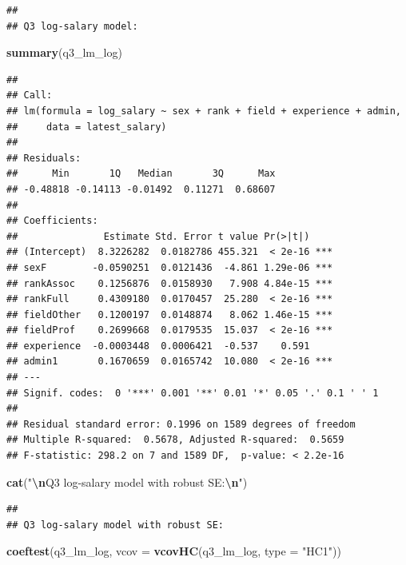 \documentclass[
]{article}
\newenvironment{Shaded}{\begin{snugshade}}{\end{snugshade}}
\newcommand{\AttributeTok}[1]{\textcolor[rgb]{0.13,0.29,0.53}{#1}}
\newcommand{\FunctionTok}[1]{\textcolor[rgb]{0.13,0.29,0.53}{\textbf{#1}}}
\newcommand{\NormalTok}[1]{#1}
\newcommand{\SpecialCharTok}[1]{\textcolor[rgb]{0.81,0.36,0.00}{\textbf{#1}}}
\newcommand{\StringTok}[1]{\textcolor[rgb]{0.31,0.60,0.02}{#1}}
\begin{document}
\begin{verbatim}
## 
## Q3 log-salary model:
\end{verbatim}

\begin{Shaded}
\begin{Highlighting}[]
\FunctionTok{summary}\NormalTok{(q3\_lm\_log)}
\end{Highlighting}
\end{Shaded}

\begin{verbatim}
## 
## Call:
## lm(formula = log_salary ~ sex + rank + field + experience + admin, 
##     data = latest_salary)
## 
## Residuals:
##      Min       1Q   Median       3Q      Max 
## -0.48818 -0.14113 -0.01492  0.11271  0.68607 
## 
## Coefficients:
##               Estimate Std. Error t value Pr(>|t|)    
## (Intercept)  8.3226282  0.0182786 455.321  < 2e-16 ***
## sexF        -0.0590251  0.0121436  -4.861 1.29e-06 ***
## rankAssoc    0.1256876  0.0158930   7.908 4.84e-15 ***
## rankFull     0.4309180  0.0170457  25.280  < 2e-16 ***
## fieldOther   0.1200197  0.0148874   8.062 1.46e-15 ***
## fieldProf    0.2699668  0.0179535  15.037  < 2e-16 ***
## experience  -0.0003448  0.0006421  -0.537    0.591    
## admin1       0.1670659  0.0165742  10.080  < 2e-16 ***
## ---
## Signif. codes:  0 '***' 0.001 '**' 0.01 '*' 0.05 '.' 0.1 ' ' 1
## 
## Residual standard error: 0.1996 on 1589 degrees of freedom
## Multiple R-squared:  0.5678, Adjusted R-squared:  0.5659 
## F-statistic: 298.2 on 7 and 1589 DF,  p-value: < 2.2e-16
\end{verbatim}

\begin{Shaded}
\begin{Highlighting}[]
\FunctionTok{cat}\NormalTok{(}\StringTok{"}\SpecialCharTok{\textbackslash{}n}\StringTok{Q3 log{-}salary model with robust SE:}\SpecialCharTok{\textbackslash{}n}\StringTok{"}\NormalTok{)}
\end{Highlighting}
\end{Shaded}

\begin{verbatim}
## 
## Q3 log-salary model with robust SE:
\end{verbatim}

\begin{Shaded}
\begin{Highlighting}[]
\FunctionTok{coeftest}\NormalTok{(q3\_lm\_log, }\AttributeTok{vcov =} \FunctionTok{vcovHC}\NormalTok{(q3\_lm\_log, }\AttributeTok{type =} \StringTok{"HC1"}\NormalTok{))}
\end{Highlighting}
\end{Shaded}
\end{document}
